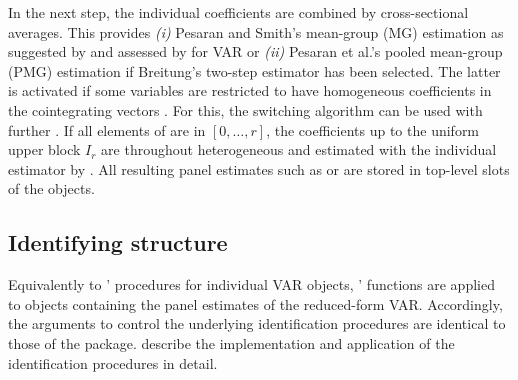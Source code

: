 In the next step, the individual coefficients are combined by cross-sectional averages. This provides \textit{(i)} Pesaran and Smith's \citeyearpar{PesaranSmith1995} mean-group (MG) estimation as suggested by \citet{CanovaCiccarelli2013} and assessed by \citet{Rebucci2010} for VAR or \textit{(ii)} Pesaran et al.'s  \citeyearpar{PesaranEtAl1999} pooled mean-group (PMG) estimation if Breitung's \citeyearpar{Breitung2005} two-step estimator has been selected. The latter is activated if some variables  are restricted to have homogeneous coefficients in the  cointegrating vectors . For this, the  switching algorithm can be used with further . If all elements of  are in $ \left[0, \ldots , r \right] $, the coefficients up to the uniform upper block $ I_{r} $ are throughout heterogeneous and estimated with the individual estimator by \citet{AhnReisel1990}. All resulting panel estimates such as  or  are stored in top-level slots of the  objects. 



\subsection{Identifying structure} \label{sec:pid}
Equivalently to '  procedures for individual VAR objects, '  functions are applied to  objects containing the panel estimates of the reduced-form VAR. Accordingly, the arguments to control the underlying identification procedures are identical to those of the  package. \cite{LangeEtAl_fc} describe the implementation and application of the identification procedures in detail. 


